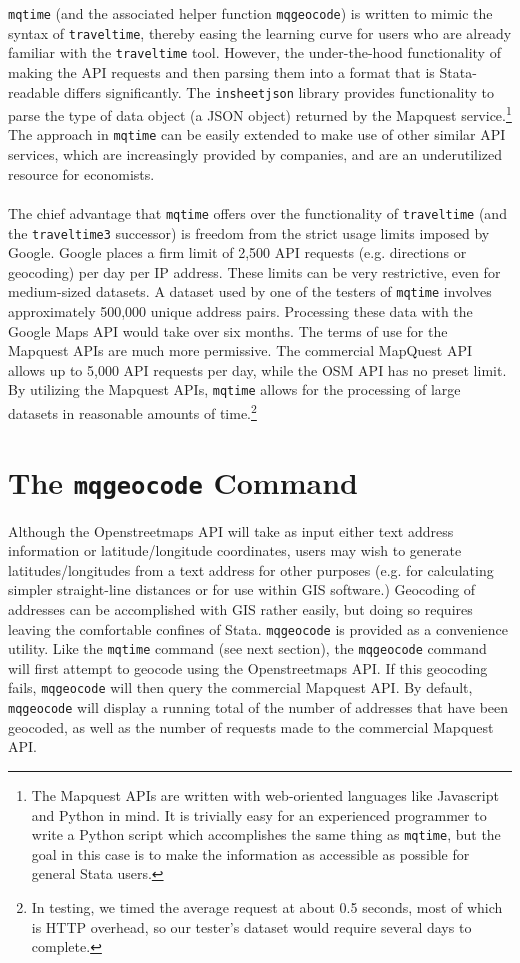 \documentclass[11pt]{article}
\begin{document}
\texttt{mqtime} (and the associated helper function \verb|mqgeocode|) is written to mimic the syntax of \verb|traveltime|, thereby easing the learning curve for users who are already familiar with the \verb|traveltime| tool. However, the under-the-hood functionality of making the API requests and then parsing them into a format that is Stata-readable differs significantly. The \verb|insheetjson| library provides functionality to parse the type of data object (a JSON object) returned by the Mapquest service.\footnote{The Mapquest APIs are written with web-oriented languages like Javascript and Python in mind. It is trivially easy for an experienced programmer to write a Python script which accomplishes the same thing as \texttt{mqtime}, but the goal in this case is to make the information as accessible as possible for general Stata users.} The approach in \verb|mqtime| can be easily extended to make use of other similar API services, which are increasingly provided by companies, and are an underutilized resource for economists. 
\\ \\
The chief advantage that \verb|mqtime| offers over the functionality of \verb|traveltime| (and the \verb|traveltime3| successor) is freedom from the strict usage limits imposed by Google. Google places a firm limit of 2,500 API requests (e.g. directions or geocoding) per day per IP address. These limits can be very restrictive, even for medium-sized datasets. A dataset used by one of the testers of \verb|mqtime| involves approximately 500,000 unique address pairs. Processing these data with the Google Maps API would take over six months. The terms of use for the Mapquest APIs are much more permissive. The commercial MapQuest API allows up to 5,000 API requests per day, while the OSM API has no preset limit. By utilizing the Mapquest APIs, \verb|mqtime| allows for the processing of large datasets in reasonable amounts of time.\footnote{In testing, we timed the average request at about 0.5 seconds, most of which is HTTP overhead, so our tester's dataset would require several days to complete.} 

\section{The \texttt{mqgeocode} Command}
Although the Openstreetmaps API will take as input either text address information or latitude/longitude coordinates, users may wish to generate latitudes/longitudes from a text address for other purposes (e.g. for calculating simpler straight-line distances or for use within GIS software.) Geocoding of addresses can be accomplished with GIS rather easily, but doing so requires leaving the comfortable confines of Stata. \verb|mqgeocode| is provided as a convenience utility. Like the \verb|mqtime| command (see next section), the \verb|mqgeocode| command will first attempt to geocode using the Openstreetmaps API. If this geocoding fails, \verb|mqgeocode| will then query the commercial Mapquest API. By default,  \verb|mqgeocode| will display a running total of the number of addresses that have been geocoded, as well as the number of requests made to the commercial Mapquest API. 
\end{document}

